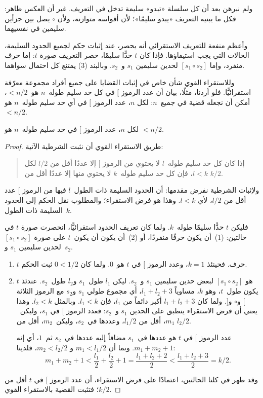 \documentclass[../../../include/open-logic-section]{subfiles}
\begin{document}
ولم نبرهن بعد أن كل سلسلة «تبدو» سليمة تدخل في التعريف. غير أن العكس
ظاهر: فكل ما يبنيه التعريف «يبدو سليمًا»؛ لأن أقواسه متوازنة، ولأن
$\circ$ يصل بين جزأين سليمين في نفسيهما.

وأعظم منفعة للتعريف الاستقرائي أنه يحصر، عند إثبات حكم لجميع الحدود
السليمة، الحالات التي يجب استيفاؤها. فإذا كان $t$ حدًّا سليمًا، حصر
التعريف صورة $t$: إما حرف منفرد، وإما $[s_1 \circ s_2]$ لحدين سليمين
$s_1$ و~$s_2$. وبالبند (3) يمتنع كل احتمال سواهما.

وللاستقراء القوي شأن خاص في إثبات القضايا على جميع أفراد مجموعة
معرّفة استقرائيًّا. فلو أردنا، مثلًا، بيان أن عدد الرموز $[$ في كل حد
سليم طوله~$n$ هو~$< n/2$، أمكن أن نجعله قضية في جميع~$n$: لكل $n$،
عدد الرموز $[$ في أي حد سليم طوله~$n$ هو $< n/2$.

\begin{prop}
  لكل $n$، عدد الرموز $[$ في حد سليم طوله~$n$ هو $< n/2$.
\end{prop}

\begin{proof}
طريق الاستقراء القوي أن نثبت الشرطية الآتية:
\begin{quote}
  إذا كان كل حد سليم طوله~$l$ لا يحتوي من الرموز $[$ إلا عددًا أقل من
  $l/2$ لكل $l < k$، فإن كل حد سليم طوله~$k$ لا يحتوي منها إلا
  عددًا أقل من $k/2$.
\end{quote}
ولإثبات الشرطية نفرض مقدمها: أن الحدود السليمة ذات الطول~$l$ فيها من
الرموز $[$ عدد أقل من $l/2$، لأي $l<k$. وهذا هو فرض الاستقراء؛
والمطلوب نقل الحكم إلى الحدود السليمة ذات الطول~$k$.

فليكن $t$ حدًّا سليمًا طوله~$k$. ولما كان تعريف الحدود استقرائيًّا،
انحصرت صورة $t$ في حالتين: (1)~أن يكون حرفًا منفردًا، أو (2)~أن يكون
  أن يكون~$t$ على صورة $[s_1 \circ s_2]$ لحدين سليمين $s_1$ و~$s_2$.
\begin{enumerate}
\item $t$ حرف. فحينئذ $k = 1$، وعدد الرموز $[$ في $t$ هو~$0$.
ولما كان $0 < 1/2$ ثبت الحكم.
\item $t$ هو $[s_1 \circ s_2]$ لبعض حدين سليمين $s_1$ و~$s_2$.
  ليكن $l_1$ طول~$s_1$ و$l_2$ طول~$s_2$. عندئذ يكون طول~$t$، وهو
  $k$، مساوياً $l_1+l_2+3$، أي مجموع طولي $s_1$ و$s_2$ مع الرموز
  الثلاثة $[$ و$\circ$ و$]$. ولما كان $l_1+l_2+3$ أكبر دائماً من
  $l_1$، فإن $l_1 < k$. وبالمثل $l_2 < k$. وهذا يعني أن فرض
  الاستقراء ينطبق على الحدين $s_1$ و~$s_2$: فعدد الرموز $[$ في
  $s_1$، وليكن~$m_1$، أقل من $l_1/2$، وعددها في~$s_2$، وليكن~$m_2$،
  أقل من $l_2/2$.

  عدد الرموز $[$ في $t$ هو عددها في~$s_1$ مضافاً إليه عددها في~$s_2$
  ثم~$1$، أي إنه $m_1 + m_2 + 1$. وبما أن $m_1 < l_1/2$ و
  $m_2 < l_2/2$، فلدينا:
  \[
  m_1 + m_2 + 1 < \frac{l_1}{2} + \frac{l_2}{2} + 1 = \frac{l_1+l_2+2}{2} < \frac{l_1+l_2+3}{2} = k/2.
  \]
\end{enumerate}
وقد ظهر في كلتا الحالتين، اعتمادًا على فرض الاستقراء، أن عدد الرموز
$[$ في $t$ أقل من $k/2$؛ فتثبت القضية بالاستقراء القوي.
\end{proof}
\end{document}
